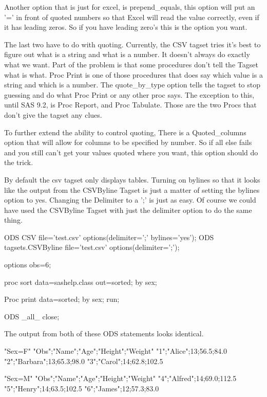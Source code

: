 Another option that is just for excel, is prepend\_equals, this option will put an '=' in front
of quoted numbers so that Excel will read the value correctly, even if it has leading zeros.  So
if you have leading zero's this is the option you want.

The last two have to do with quoting.  Currently, the CSV tagset tries it's best to figure out
what is a string and what is a number.  It doesn't always do exactly what we want.  Part of
the problem is that some procedures don't tell the Tagset what is what.  Proc Print is one of
those procedures that does say which value is a string and which is a number.  The quote\_by\_type
option tells the tagset to stop guessing and do what Proc Print or any other proc says.  The
exception to this, until SAS 9.2, is Proc Report, and Proc Tabulate.  Those are the two Procs
that don't give the tagset any clues.

To further extend the ability to control quoting, There is a Quoted\_columns option that will
allow for columns to be specified by number.  So if all else fails and you still can't get
your values quoted where you want, this option should do the trick.


By default the csv tagset only displays tables.  Turning on bylines so that it looks
like the output from the CSVByline Tagset 
is just a matter of setting the bylines option to yes.  Changing the Delimiter to a
';' is just as easy.  Of course we could have used the CSVByline Tagset with just
the delimiter option to do the same thing.

\begin{sfvcode}
ODS CSV file='test.csv' options(delimiter=';' bylines='yes');
ODS tagsets.CSVByline file='test.csv' options(delimiter=';');

options obs=6;

proc sort data=sashelp.class out=sorted;
     by sex;

Proc print data=sorted;
     by sex;
run;

ODS _all_ close;
\end{sfvcode}

The output from both of these ODS statements looks identical.

\begin{sfvoutput}
"Sex=F"
"Obs";"Name";"Age";"Height";"Weight"
"1";"Alice";13;56.5;84.0
"2";"Barbara";13;65.3;98.0
"3";"Carol";14;62.8;102.5

"Sex=M"
"Obs";"Name";"Age";"Height";"Weight"
"4";"Alfred";14;69.0;112.5
"5";"Henry";14;63.5;102.5
"6";"James";12;57.3;83.0
\end{sfvoutput}

